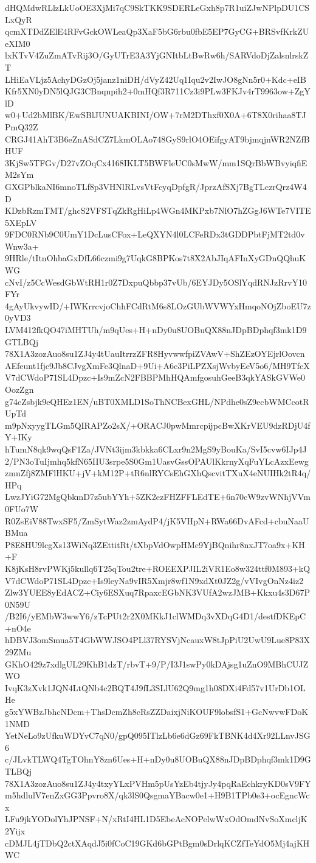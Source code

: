 dHQMdwRLlzLkUoOE3XjMi7qC9SkTKK9SDERLeGxh8p7R1uiZJwNPlpDU1CSLxQyR
qcmXTDdZElE4RFvGckOWLeaQp3XaF5bG6rbu0fbE5EP7GyCG+BRSvfKrkZUeXIM0
lxKTvV4ZuZmATvRij3O/GyUTrE3A3YjGNItbLtBwRw6h/SARVdoDjZalsnlrskZT
LHiEaVLjz5AchyDGzOj5janz1niDH/dVyZ42Uq1Iqu2v2IwJO8gNn5r0+Kdc+eIB
Kfr5XN0yDN5lQJG3CBnqnpih2+0mHQf3R711Cz3i9PLw3FKJv4rT9963ow+ZgYlD
w0+Ud2bMlBK/EwSBlJUNUAKBINI/OW+7rM2DThxf0X0A+6T8X0rihaa8TJPmQ32Z
CRGJ41AhT3B6eZnASdCZ7LkmOLAo748GyS9rlO4OEifgyAT9bjmqjnWR2NZfBHUF
3KjSw5TFGv/D27vZOqCx4168IKLT5BWFleUC0sMwW/mm1SQrBbWBvyiqfiEM2sYm
GXGPblkaNI6mnoTLf8p3VHNlRLvsVtFcyqDpfgR/JprzAfSXj7BgTLczrQrz4W4D
KDzbRzmTMT/ghcS2VFSTqZkRgHiLp4WGn4MKPxb7NlO7hZGgJ6WTe7VITE5XEpLV
9FDC0RNb9C0UmY1DcLusCFox+LeQXYN4l0LCFeRDx3tGDDPbtFjMT2td0vWnw3a+
9HRle/tItnOhbaGxDfL66czmi9g7UqkG8BPKos7t8X2AbJIqAFInXyGDnQQhuKWG
cNvI/z5CcWesdGbWtRH1r0Z7DxpuQbbp37vUb/6EYJDy5OSlYqdRNJzRrvY10FYr
4gAyUkvywID/+IWKrrcvjoChhFCdRtM6s8LOzGUbWVWYxHmqoNOjZboEU7z0yVD3
LVM412fkQO47iMHTUh/m9qUes+H+nDy0u8UOBuQX88nJDpBDphqf3mk1D9GTLBQj
78X1A3zozAuo8su1ZJ4y4tUauItrrzZFR8HyvwwfpiZVAwV+ShZEzOYEjrlOovcn
AEfeunt1fjc9Jb8CJvgXmFe3QlnaD+9Ui+A6c3PiLPZXsjWvbyEeV5o6/MH9TfcX
V7dCWdoP71SL4Dpzc+Is9mZcN2FBBPMhHQAmfgosuhGeeB3qkYASkGVWe0OozZgn
g74cZsbjk9eQHEz1EN/uBT0XMLD1SoThNCBexGHL/NPdhe0sZ9ecbWMCcotRUpTd
m9pNxyygTLGm5QIRAPZo2sX/+ORACJ0pwMmrcpijpcBwXKrVEU9dzRDjU4fY+IKy
hTumN8qk9wqQsF1Za/JVNt3ijm3kbkka6CLxr9n2MgS9yBouKa/SvI5cvw6IJp4J
2/PN3oTuIjmhq5kfN65IIU3srpe5S0Gm1UasvGssOPAUlKkrnyXqFuYLcAzxEewg
zmnZfj8ZMFlHKU+jV+kM12P+tR6nlRYCsEhGXhQscvitTXuX4eNUIHk2tR4q/HPq
LwzJYiG72MgQbkmD7z5ubYYh+5ZK2ezFHZFFLEdTE+6n70cW9zvWNhjVVm0FUo7W
R0ZsEiV88TwxSF5/ZmSytWaz2zmAydP4/jK5VHpN+RWa66DvAFcd+cbuNaaUBMua
P8E8HU9lcgXs13WiNq3ZEttitRt/tXbpVdOwpHMc9YjBQnihr8nxJT7oa9x+KH+F
K8jKsH8rvPWKj5kullq6T25qTou2tre+ROEEXPJIL2iVR1Eo8w324ttf0M893+kQ
V7dCWdoP71SL4Dpzc+Is9leyNa9vIR5Xmjr8wf1N9xdXt0JZ2g/vVIvgOnNz4iz2
Zlw3YUEE8yEdACZ+Ciy6ESXuq7RpaxcEGbNK3VUfA2wzJMB+Kkxu4s3D67P0N59U
/B2I6/yEMbW3wwY6/zTcPUt2r2X0MKkJ1clWMDq3vXDqG4D1/destfDKEpC+nO4e
hDBVJ3omSmua5T4GbWWJSO4PLl37RYSVjNcauxW8tJpPiU2UwU9Lue8P83X29ZMu
GKhO429z7xdlgUL29KhB1dzT/rbvT+9/P/I3J1swPy0kDAjsg1uZnO9MBhCUJZWO
IvqK3zXvk1JQN4LtQNb4c2BQT4J9fL3SLlU62Q9mg1h08DXi4Fd57v1UrDb1OLHe
g5xYWBzJbhcNDcm+ThsDcmZh8cRsZZDaixjNiKOUF9lobsfS1+GcNwvwFDoK1NMD
YetNeLo9zUfkuWDYvC7qN0/gpQ095ITlzLb6e6dGz69FkTBNK4d4Xr92LLnvJSG6
c/JLvkTLWQ4TgTOhnY8zn6Ues+H+nDy0u8UOBuQX88nJDpBDphqf3mk1D9GTLBQj
78X1A3zozAuo8su1ZJ4y4txyYLxPVHm5pUsYzEb4tjyJy4pqRaEchkryKD0sV9FY
m5hdlulV7enZxGG3Ppvro8X/qk3lS0QsgmaYBacw0e1+H9B1TPb0e3+ocEgncWcx
LFu9jkYODolYhJPNSF+N/xRtI4HL1D5EbeAcNOPelwWxOdOmdNvSoXmcljK2Yijx
cDMJL4jTDbQ2ctXAqdJ5i0fCoC19GKd6bGPtBgm0sDrlqKCZfTeYdO5Mj4ajKHWC
